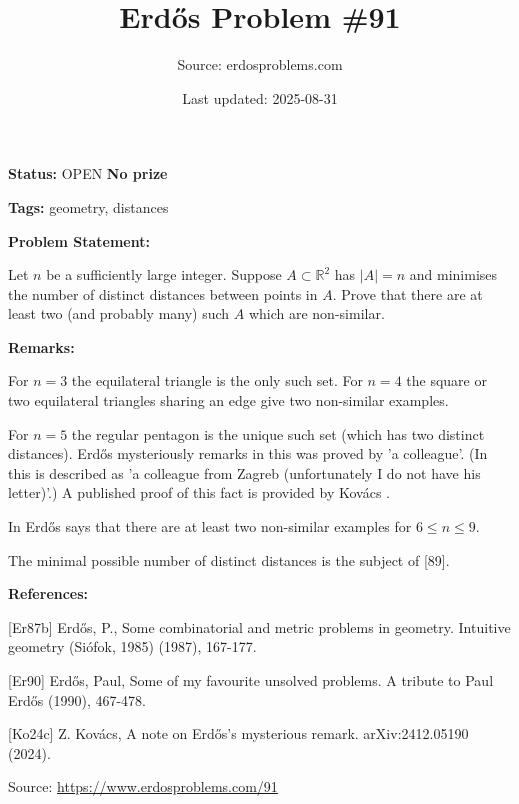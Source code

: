 \documentclass{article}
\title{Erd\H{o}s Problem \#91}
\date{Last updated: 2025-08-31}
\author{Source: erdosproblems.com}
\begin{document}
\maketitle

\noindent\textbf{Status:} OPEN \quad \textbf{No prize}

\noindent\textbf{Tags:} geometry, distances

\medskip
\noindent\textbf{Problem Statement:}

Let $n$ be a sufficiently large integer. Suppose $A\subset \mathbb{R}^2$ has $\lvert A\rvert=n$ and minimises the number of distinct distances between points in $A$. Prove that there are at least two (and probably many) such $A$ which are non-similar.

\bigskip
\noindent\textbf{Remarks:}

For $n=3$ the equilateral triangle is the only such set. For $n=4$ the square or two equilateral triangles sharing an edge give two non-similar examples.

For $n=5$ the regular pentagon is the unique such set (which has two distinct distances). Erd\H{o}s mysteriously remarks in \cite{Er90} this was proved by 'a colleague'. (In \cite{Er87b} this is described as 'a colleague from Zagreb (unfortunately I do not have his letter)'.) A published proof of this fact is provided by Kov\'{a}cs \cite{Ko24c}.

In \cite{Er87b} Erd\H{o}s says that there are at least two non-similar examples for $6\leq n\leq 9$.

The minimal possible number of distinct distances is the subject of [89].

\bigskip
\noindent\textbf{References:}

[Er87b] Erd\H{o}s, P., Some combinatorial and metric problems in geometry. Intuitive geometry (Si\'{o}fok, 1985) (1987), 167-177.
 
 [Er90] Erd\H{o}s, Paul, Some of my favourite unsolved problems. A tribute to Paul Erd\H{o}s (1990), 467-478.
 
 [Ko24c] Z. Kov\'{a}cs, A note on Erd\H{o}s's mysterious remark. arXiv:2412.05190 (2024).

\bigskip
\noindent\small{Source: \url{https://www.erdosproblems.com/91}}
\end{document}

